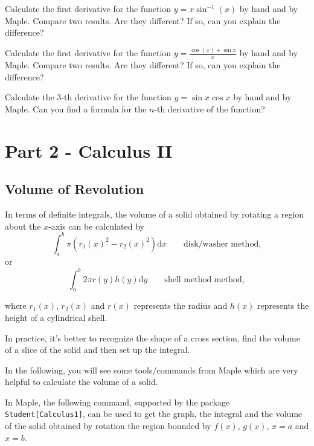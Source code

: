 \documentclass[]{book}
\theoremstyle{definition}
\theoremstyle{definition}
\theoremstyle{definition}
\theoremstyle{remark}
\let\BeginKnitrBlock\begin \let\EndKnitrBlock\end
\begin{document}
\BeginKnitrBlock{exercise}
\protect\hypertarget{exr:unnamed-chunk-11}{}{\label{exr:unnamed-chunk-11} }
Calculate the first derivative for the function \(y=x\sin^{-1}(x)\) by hand and by Maple. Compare two results. Are they different? If so, can you explain the difference?
\EndKnitrBlock{exercise}

\BeginKnitrBlock{exercise}
\protect\hypertarget{exr:unnamed-chunk-12}{}{\label{exr:unnamed-chunk-12} }
Calculate the first derivative for the function \(y=\frac{\cos(x)+\sin x}{x}\) by hand and by Maple. Compare two results. Are they different? If so, can you explain the difference?
\EndKnitrBlock{exercise}

\BeginKnitrBlock{exercise}
\protect\hypertarget{exr:unnamed-chunk-13}{}{\label{exr:unnamed-chunk-13} }
Calculate the \(3\)-th derivative for the function \(y=\sin x\cos x\) by hand and by Maple. Can you find a formula for the \(n\)-th derivative of the function?
\EndKnitrBlock{exercise}

\hypertarget{part-part-2---calculus-ii}{%
\part*{Part 2 - Calculus II}\label{part-part-2---calculus-ii}}

\hypertarget{volume-of-revolution}{%
\chapter{Volume of Revolution}\label{volume-of-revolution}}

In terms of definite integrals, the volume of a solid obtained by rotating a region about the \(x\)-axis can be calculated by
\[\int_a^b \pi (r_1(x)^2 - r_2(x)^2) \mathrm{d} x \qquad \text{disk/washer method},\]
or
\[\int_a^b 2\pi r(y) h(y) \mathrm{d} y \qquad \text{shell method method},\]

where \(r_1(x)\), \(r_2(x)\) and \(r(x)\) represents the radius and \(h(x)\) represents the height of a cylindrical shell.

In practice, it's better to recognize the shape of a cross section, find the volume of a slice of the solid and then set up the integral.

In the following, you will see some tools/commands from Maple which are very helpful to calculate the volume of a solid.

In Maple, the following command, supported by the package \texttt{Student{[}Calculus1{]}}, can be used to get the graph, the integral and the volume of the solid obtained by rotation the region bounded by \(f(x)\), \(g(x)\), \(x=a\) and \(x=b\).
\end{document}
